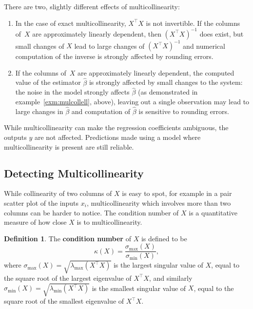 \documentclass[
  a4paper,
]{article}
\theoremstyle{definition}
\newtheorem{definition}{Definition}[section]
\theoremstyle{definition}
\theoremstyle{definition}
\theoremstyle{definition}
\theoremstyle{remark}
\begin{document}
There are two, slightly different effects of multicollinearity:

\begin{enumerate}
\def\labelenumi{\arabic{enumi}.}
\item
  In the case of exact multicollinearity, \(X^\top X\) is not invertible.
  If the columns of~\(X\) are approximately linearly dependent, then
  \((X^\top X)^{-1}\) does exist, but small changes of \(X\) lead to large changes
  of \((X^\top X)^{-1}\) and numerical computation of the inverse is
  strongly affected by rounding errors.
\item
  If the columns of~\(X\) are approximately linearly dependent,
  the computed value of the estimator \(\hat\beta\) is strongly affected
  by small changes to the system: the noise in the model strongly affects
  \(\hat\beta\) (as demonstrated in example~\ref{exm:mulcollell}, above),
  leaving out a single observation may lead to large changes in \(\hat\beta\)
  and computation of \(\hat\beta\) is sensitive to rounding errors.
\end{enumerate}

While multicollinearity can make the regression coefficients ambiguous,
the outputs \(y\) are not affected. Predictions made using a model
where multicollinearity is present are still reliable.

\subsection{Detecting Multicollinearity}\label{detecting-multicollinearity}

While collinearity of two columns of \(X\) is easy to spot, for example in
a pair scatter plot of the inputs \(x_i\), multicollinearity which involves
more than two columns can be harder to notice. The condition number of
\(X\) is a quantitative measure of how close \(X\) is to multicollinearity.

\begin{definition}
The \textbf{condition number} of \(X\) is defined to be
\begin{equation*}
  \kappa(X)
  = \frac{\sigma_\mathrm{max}(X)}{\sigma_\mathrm{min}(X)},
\end{equation*}
where \(\sigma_\mathrm{max}(X) = \sqrt{\lambda_\mathrm{max}(X^\top X)}\) is the
largest singular value of \(X\), equal to the square root of the largest
eigenvalue of \(X^\top X\), and similarly \(\sigma_\mathrm{min}(X) =
\sqrt{\lambda_\mathrm{min}(X^\top X)}\) is the smallest singular value of \(X\),
equal to the square root of the smallest eigenvalue of \(X^\top X\).
\end{definition}
\end{document}

